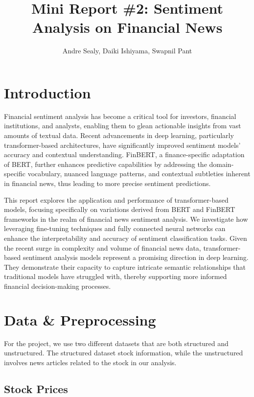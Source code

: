 \documentclass[12pt]{article}
\title{Mini Report \#2: Sentiment Analysis on Financial News}
\author{Andre Sealy, Daiki Ishiyama, Swapnil Pant}
\begin{document}
	
\maketitle

\section*{Introduction}

Financial sentiment analysis has become a critical tool for investors, financial institutions, and analysts, enabling them to glean actionable insights from vast amounts of textual data. Recent advancements in deep learning, particularly transformer-based architectures, have significantly improved sentiment models' accuracy and contextual understanding. FinBERT, a finance-specific adaptation of BERT, further enhances predictive capabilities by addressing the domain-specific vocabulary, nuanced language patterns, and contextual subtleties inherent in financial news, thus leading to more precise sentiment predictions.

This report explores the application and performance of transformer-based models, focusing specifically on variations derived from BERT and FinBERT frameworks in the realm of financial news sentiment analysis. We investigate how leveraging fine-tuning techniques and fully connected neural networks can enhance the interpretability and accuracy of sentiment classification tasks. Given the recent surge in complexity and volume of financial news data, transformer-based sentiment analysis models represent a promising direction in deep learning. They demonstrate their capacity to capture intricate semantic relationships that traditional models have struggled with, thereby supporting more informed financial decision-making processes.

\section*{Data \& Preprocessing}

For the project, we use two different datasets that are both structured and unstructured. The structured dataset stock information, while the unstructured involves news articles related to the stock in our analysis.

\subsection*{Stock Prices}
\end{document}

